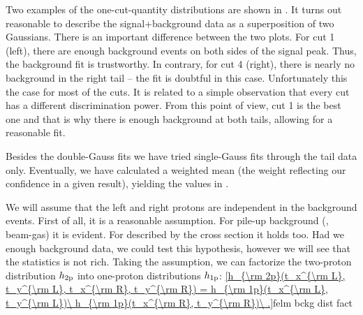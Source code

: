 
Two examples of the one-cut-quantity distributions are shown in . It turns out reasonable to describe the signal+background data as a superposition of two Gaussians.
There is an important difference between the two plots. For cut 1 (left), there are enough background events on both sides of the signal peak. Thus, the background fit is trustworthy. In contrary, for cut 4 (right), there is nearly no background in the right tail -- the fit is doubtful in this case. Unfortunately this the case for most of the cuts. It is related to a simple observation that every cut has a different discrimination power. From this point of view, cut 1 is the best one and that is why there is enough background at both tails, allowing for a reasonable fit.

Besides the double-Gauss fits we have tried single-Gauss fits through the tail data only. Eventually, we have calculated a weighted mean (the weight reflecting our confidence in a given result), yielding the values in .



We will assume that the left and right protons are independent in the background events. First of all, it is a reasonable assumption. For pile-up background (, beam-gas) it is evident. For  described by the cross section  it holds too. Had we enough background data, we could test this hypothesis, however we will see that the statistics is not rich. Taking the assumption, we can factorize the two-proton distribution $h_{\rm 2p}$ into one-proton distributions $h_{\rm 1p}$:
\eqref{h_{\rm 2p}(t_x^{\rm L}, t_y^{\rm L}, t_x^{\rm R}, t_y^{\rm R}) = h_{\rm 1p}(t_x^{\rm L}, t_y^{\rm L})\ h_{\rm 1p}(t_x^{\rm R}, t_y^{\rm R})\ .}{felm bckg dist fact}

